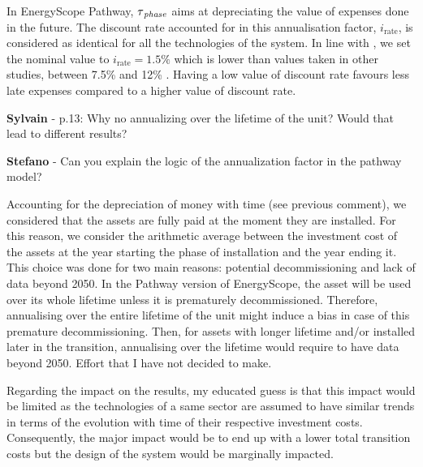 \documentclass[12pt,a4paper]{article}
\begin{document}
\begin{mdframed}[style=manuscript] %
In EnergyScope Pathway, $\tau\textsubscript{\emph{phase}}$ aims at depreciating the value of expenses done in the future. The discount rate accounted for in this annualisation factor, $i_{\text{rate}}$, is considered as identical for all the technologies of the system. In line with \citet{limpens2021generating}, we set the nominal value to $i_{\text{rate}}=1.5\%$ which is lower than values taken in other studies, between 7.5\% and 12\% \cite{meinke2017energy,simoes2013jrc,EuropeanCommission2016}. Having a low value of discount rate favours less late expenses compared to a higher value of discount rate.
\end{mdframed}

\begin{mdframed}[style=comment] %
{\color{purple} \textbf{Sylvain}} - p.13: Why no annualizing over the lifetime of the unit? Would that lead to different results? 

{\color{orange} \textbf{Stefano}} - Can you explain the logic of the annualization factor in the pathway model?
\end{mdframed}

\noindent Accounting for the depreciation of money with time (see previous comment), we considered that the assets are fully paid at the moment they are installed. For this reason, we consider the arithmetic average between the investment cost of the assets at the year starting the phase of installation and the year ending it. This choice was done for two main reasons: potential decommissioning and lack of data beyond 2050. In the Pathway version of EnergyScope, the asset will be used over its whole lifetime unless it is prematurely decommissioned. Therefore, annualising over the entire lifetime of the unit might induce a bias in case of this premature decommissioning. Then, for assets with longer lifetime and/or installed later in the transition, annualising over the lifetime would require to have data beyond 2050. Effort that I have not decided to make.

Regarding the impact on the results, my educated guess is that this impact would be limited as the technologies of a same sector are assumed to have similar trends in terms of the evolution with time of their respective investment costs. Consequently, the major impact would be to end up with a lower total transition costs but the design of the system would be marginally impacted.
\end{document}
